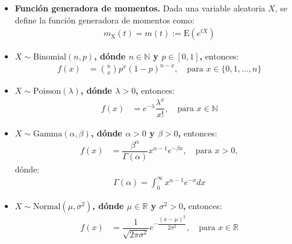 \documentclass[8pt]{article}
\begin{document}
\begin{itemize}
    \item \textbf{Función generadora de momentos.} Dada una variable aleatoria $X$, se define la función generadora de momentos como:
    \begin{align*}
        m_{\text{X}}(t) = m(t) := \text{E}(e^{tX})
    \end{align*}

    \item \textbf{$X \sim \text{Binomial}(n, p)$, dónde $n \in \mathbb{N}$ y $p \in [0, 1]$,} entonces:
    \begin{align*}
        f(x) &= \binom{n}{x} p^x (1-p)^{n-x}, \quad \text{para } x \in \{0, 1, \ldots, n\}
    \end{align*}

    \item \textbf{$X \sim \text{Poisson}(\lambda)$, dónde $\lambda > 0$,} entonces:
    \begin{align*}
        f(x) &= e^{-\lambda} \dfrac{\lambda^x}{x!}, \quad \text{para } x \in \mathbb{N}
    \end{align*}

    \item \textbf{$X \sim \text{Gamma}(\alpha, \beta)$, dónde $\alpha > 0$ y $\beta > 0$,} entonces:
    \begin{align*}
        f(x) &= \dfrac{\beta^\alpha}{\Gamma(\alpha)} x^{\alpha-1} e^{-\beta x}, \quad \text{para } x > 0,
    \end{align*}
    dónde:
    \begin{align*}
        \Gamma(\alpha) = \int_0^{\infty} x^{\alpha-1} e^{-x} dx
    \end{align*}

    \item \textbf{$X \sim \text{Normal}(\mu, \sigma^2)$, dónde $\mu \in \mathbb{R}$ y $\sigma^2 > 0$,} entonces:
    \begin{align*}
        f(x) &= \dfrac{1}{\sqrt{2\pi\sigma^2}} e^{-\dfrac{(x-\mu)^2}{2\sigma^2}}, \quad \text{para } x \in \mathbb{R}
    \end{align*}
\end{itemize}
\end{document}
